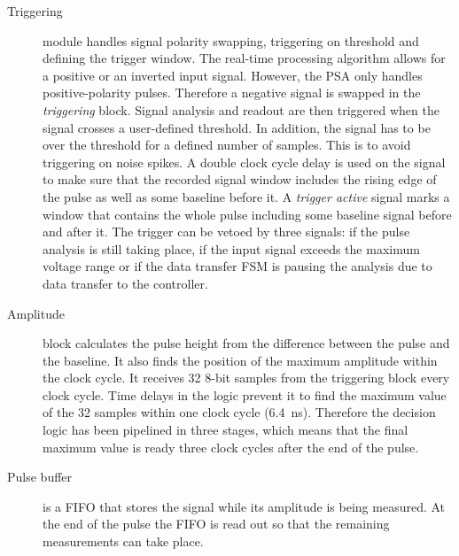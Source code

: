 \begin{description}
\item[Triggering] module handles signal polarity swapping, triggering on threshold and defining the trigger window. The real-time processing algorithm allows for a positive or an inverted input signal. However, the PSA only handles positive-polarity pulses. Therefore a negative signal is swapped in the \textit{triggering} block. Signal analysis and readout are then triggered when the signal crosses a user-defined threshold. In addition, the signal has to be over the threshold for a defined number of samples. This is to avoid triggering on noise spikes.
A double clock cycle delay is used on the signal to make sure that the recorded signal window includes the rising edge of the pulse as well as some baseline before it. A \textit{trigger active} signal marks a window that contains the whole pulse including some baseline signal before and after it. 
The trigger can be vetoed by three signals: if the pulse analysis is still taking place, if the input signal exceeds the maximum voltage range or if the data transfer FSM is pausing the analysis due to data transfer to the controller.

%


\item[Amplitude] block calculates the pulse height from the difference between the pulse and the baseline. It also finds the position of the maximum amplitude within the clock cycle. It receives 32 8-bit samples from the triggering block every clock cycle. Time delays in the logic prevent it to find the maximum value of the 32 samples within one clock cycle (6.4~ns). Therefore the decision logic has been pipelined in three stages, which means that the final maximum value is ready three clock cycles after the end of the pulse.
\item[Pulse buffer] is a FIFO that stores the signal while its amplitude is being measured. At the end of the pulse the FIFO is read out so that the remaining measurements can take place. 


\end{description}
